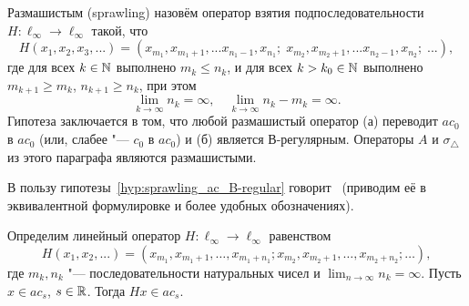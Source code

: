 \begin{hypothesis}
	\label{hyp:sprawling_ac_B-regular}
	Размашистым (sprawling)
	назовём оператор взятия подпоследовательности $H:\ell_\infty \to \ell_\infty$ такой, что
	\begin{equation}
		H(x_1,x_2, x_3, ...) =
		(
		x_{m_1},x_{m_1+1},...x_{n_1-1},x_{n_1};\;
		x_{m_2},x_{m_2+1},...x_{n_2-1},x_{n_2};\;
		...)
		,
	\end{equation}
	где для всех $k\in\mathbb{N}$ выполнено $m_k\leq n_k$,
	и для всех $k > k_0 \in \mathbb{N}$ выполнено
	$m_{k+1} \geq m_k$, $n_{k+1} \geq n_k$,
	при этом
	\begin{equation}
		\lim_{k\to\infty} n_k = \infty, \quad \lim_{k\to\infty} n_k - m_k = \infty
		.
	\end{equation}
	Гипотеза заключается в том, что любой размашистый оператор
	(а) переводит $ac_0$ в $ac_0$ (или, слабее "--- $c_0$ в $ac_0$) и
	(б) является В-регулярным.
	Операторы $A$ и $\sigma_\triangle$ из этого параграфа являются размашистыми.
\end{hypothesis}

В пользу гипотезы~\ref{hyp:sprawling_ac_B-regular} говорит~\cite[теорема 1]{usachev2008transforms} (приводим её в эквивалентной формулировке и более удобных обозначениях).

\begin{theorem}
	Определим линейный оператор $H:\ell_\infty\to\ell_\infty$ равенством
	\begin{equation}
		H(x_1, x_2, ...) = \left(x_{m_1}, x_{m_1+1}, \ldots, x_{m_1+n_1} ; x_{m_2}, x_{m_2+1}, \ldots, x_{m_2+n_2} ; \ldots\right)
		,
	\end{equation}
	где $m_k, n_k$ "--- последовательности натуральных чисел и $\lim_{n\to\infty} n_k = \infty$.
	Пусть $x\in ac_s$, $s\in\mathbb{R}$. Тогда $Hx \in ac_s$.
\end{theorem}
